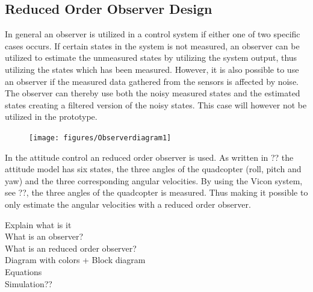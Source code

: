 \subsection{Reduced Order Observer Design}

In general an observer is utilized in a control system if either one of two specific cases occurs. If certain states in the system is not measured, an observer can be utilized to estimate the unmeasured states by utilizing the system output, thus utilizing the states which has been measured. However, it is also possible to use an observer if the measured data gathered from the sensors is affected by noise. The observer can thereby use both the noisy measured states and the estimated states creating a filtered version of the noisy states. This case will however not be utilized in the prototype.



\begin{figure}[H]
\texttt{[image: figures/Observerdiagram1]}
\centering
\captionsetup{justification=centering}
\label{Observerdiagram}
\end{figure}

In the attitude control an reduced order observer is used. As written in ?? the attitude model has six states, the three angles of the quadcopter (roll, pitch and yaw) and the three corresponding angular velocities. By using the Vicon system, see ??, the three angles of the quadcopter is measured. Thus making it possible to only estimate the angular velocities with a reduced order observer. 



Explain what is it\\
	What is an observer?\\
	
	What is an reduced order observer?\\
Diagram with colors + Block diagram\\
Equations\\
Simulation??\\



